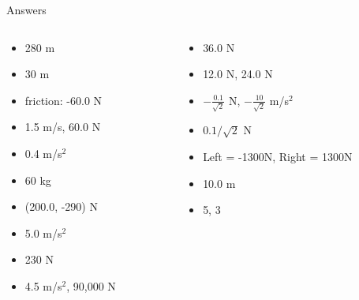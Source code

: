 \documentclass{beamer}
\begin{document}
\begin{frame}{Answers}
\begin{columns}[T]
\begin{column}{0.5\textwidth}
\begin{itemize}
\item 280 m
\item 30 m
\item friction: -60.0 N
\item 1.5 m/s, 60.0 N
\item 0.4 m/s$^2$
\item 60 kg
\item (200.0, -290) N
\item 5.0 m/s$^2$
\item 230 N
\item 4.5 m/s$^2$, 90,000 N
\end{itemize}
\end{column}
\begin{column}{0.5\textwidth}
\begin{itemize}
\item 36.0 N
\item 12.0 N, 24.0 N
\item $-\frac{0.1}{\sqrt{2}}$ N, $-\frac{10}{\sqrt{2}}$ m/s$^2$
\item $0.1/\sqrt{2}$ N
\item Left = -1300N, Right = 1300N
\item 10.0 m
\item 5, 3
\end{itemize}
\end{column}
\end{columns}
\end{frame}
\end{document}
